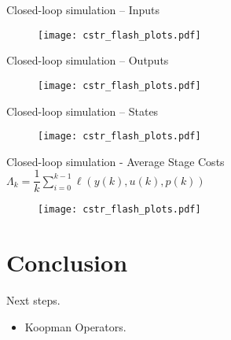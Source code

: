 \documentclass[xcolor=dvipsnames, 8pt]{beamer} %
\begin{document}
\begin{frame}{Closed-loop simulation -- Inputs}
		\begin{figure}
		\centering
		\texttt{[image: cstr\_flash\_plots.pdf]}
		\end{figure}
\end{frame}

\begin{frame}{Closed-loop simulation -- Outputs}
	\begin{figure}
	\centering
	\texttt{[image: cstr\_flash\_plots.pdf]}
	\end{figure}
\end{frame}

\begin{frame}{Closed-loop simulation -- States}
	\begin{figure}
	\centering
	\texttt{[image: cstr\_flash\_plots.pdf]}
	\end{figure}
\end{frame}

\begin{frame}{Closed-loop simulation - Average Stage Costs}
	\centering
	$\Lambda_k = \dfrac{1}{k}\sum_{i=0}^{k-1} \ell(y(k), u(k), p(k))$
	\vspace{-0.05in}
		\begin{figure}
		\centering
		\texttt{[image: cstr\_flash\_plots.pdf]}
		\end{figure}
\end{frame}

\section{Conclusion}
\begin{frame}{Next steps.}
\begin{itemize}
	\item  Koopman Operators.
\end{itemize}  
\end{frame}

%
%
\end{document}
